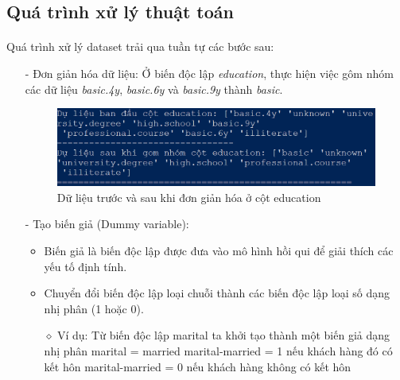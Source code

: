 \documentclass{report}
\newcommand\tab[1][1.25cm]{\hspace*{#1}}
\begin{document}
        \subsection{Quá trình xử lý thuật toán}
        \fontsize{13}{10}\selectfont\paragraph{}
            Quá trình xử lý dataset trải qua tuần tự các bước sau:
            \begin{enumerate}
                    \item [- ] Đơn giản hóa dữ liệu: Ở biến độc lập \textit{education}, thực hiện việc gôm nhóm các dữ liệu \textit{basic.4y}, \textit{basic.6y} và \textit{basic.9y} thành \textit{basic}.
                    
                    \begin{figure}[htp]
                        \centering
                        \tab[1cm]\includegraphics[scale = 0.72]{image/VC_1.png}
                        \caption{Dữ liệu trước và sau khi đơn giản hóa ở cột education}
                    \end{figure}
                    
                    \item [- ]	Tạo biến giả (Dummy variable):
                        \begin{itemize}
                            \item Biến giả là biến độc lập được đưa vào mô hình hồi qui để giải thích các yếu tố định tính.
                            \item Chuyển đổi biến độc lập loại chuỗi thành các biến độc lập loại số dạng nhị phân (1 hoặc 0).
                            \item [$\diamond$] Ví dụ: Từ biến độc lập marital ta khởi tạo thành một biến giả dạng nhị phân 
                            \newline\tab[1.25cm] marital = married
                            \newline\tab[1.25cm] marital-married = 1 nếu khách hàng đó có kết hôn
                            \newline\tab[1.25cm] marital-married = 0 nếu khách hàng không có kết hôn
                        \end{itemize}
                        

\end{enumerate}
\end{document}
